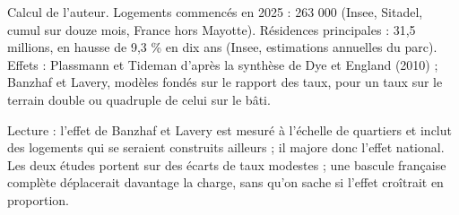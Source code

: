 Calcul de l'auteur. Logements commencés en 2025 : 263 000 (Insee, Sitadel, cumul sur douze mois, France hors Mayotte). Résidences principales : 31,5 millions, en hausse de 9,3 \% en dix ans (Insee, estimations annuelles du parc). Effets : Plassmann et Tideman d'après la synthèse de Dye et England (2010) ; Banzhaf et Lavery, modèles fondés sur le rapport des taux, pour un taux sur le terrain double ou quadruple de celui sur le bâti.\par Lecture : l'effet de Banzhaf et Lavery est mesuré à l'échelle de quartiers et inclut des logements qui se seraient construits ailleurs ; il majore donc l'effet national. Les deux études portent sur des écarts de taux modestes ; une bascule française complète déplacerait davantage la charge, sans qu'on sache si l'effet croîtrait en proportion.
